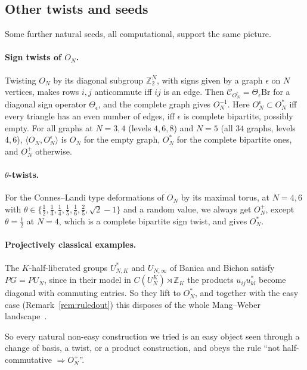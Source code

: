 \documentclass[11pt]{amsart}
\theoremstyle{definition}
\theoremstyle{remark}
\theoremstyle{plain}
\numberwithin{equation}{section}
\numberwithin{table}{section}
\newcommand{\Z}{\mathbb Z}
\newcommand{\Br}{\mathrm{Br}}
\begin{document}
\subsection{Other twists and seeds}\label{sec:othertwists}

Some further natural seeds, all computational, support the same picture.

\paragraph{Sign twists of $O_N$.} Twisting $O_N$ by its diagonal subgroup $\Z_2^N$, with signs given by a graph $\epsilon$ on $N$ vertices, makes rows $i,j$ anticommute iff $ij$ is an edge. Then $\mathcal C_{O_N^\epsilon}=\Theta_\epsilon\Br$ for a diagonal sign operator $\Theta_\epsilon$, and the complete graph gives $O_N^{-1}$. Here $O_N^\epsilon\subset O_N^*$ iff every triangle has an even number of edges, iff $\epsilon$ is complete bipartite, possibly empty. For all graphs at $N=3,4$ (levels $4,6,8$) and $N=5$ (all $34$ graphs, levels $4,6$), $\langle O_N,O_N^\epsilon\rangle$ is $O_N$ for the empty graph, $O_N^*$ for the complete bipartite ones, and $O_N^+$ otherwise.

\paragraph{$\theta$-twists.} For the Connes--Landi type deformations of $O_N$ by its maximal torus, at $N=4,6$ with $\theta\in\{\frac12,\frac13,\frac14,\frac15,\frac16,\frac25,\sqrt2-1\}$ and a random value, we always get $O_N^+$, except $\theta=\frac12$ at $N=4$, which is a complete bipartite sign twist, and gives $O_N^*$.

\paragraph{Projectively classical examples.} The $K$-half-liberated groups $U_{N,K}^*$ and $U_{N,\infty}$ of Banica and Bichon satisfy $PG=PU_N$, since in their model in $C(U_N^K)\rtimes\Z_K$ the products $u_{ij}u_{kl}^*$ become diagonal with commuting entries. So they lift to $O_N^*$, and together with the easy case (Remark~\ref{rem:ruledout}) this disposes of the whole Mang--Weber landscape~\cite{mw}.

So every natural non-easy construction we tried is an easy object seen through a change of basis, a twist, or a product construction, and obeys the rule ``not half-commutative $\Rightarrow O_N^+$''.
\end{document}
